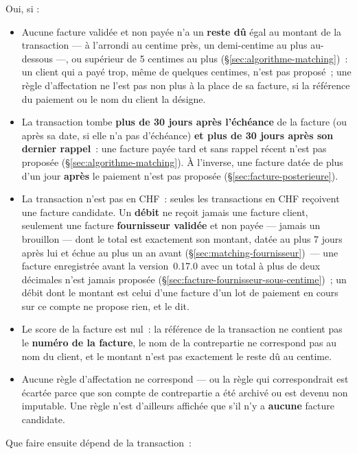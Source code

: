 \documentclass[a4paper,11pt,oneside]{article}
\begin{document}
Oui, si :

\begin{itemize}
    \item Aucune facture validée et non payée n'a un \textbf{reste dû} égal au montant de la transaction --- à l'arrondi au centime près, un demi-centime au plus au-dessous ---, ou supérieur de 5 centimes au plus (\S\ref{sec:algorithme-matching})~: un client qui a payé trop, même de quelques centimes, n'est pas proposé~; une règle d'affectation ne l'est pas non plus à la place de sa facture, si la référence du paiement ou le nom du client la désigne.
    \item La transaction tombe \textbf{plus de 30 jours après l'échéance} de la facture (ou après sa date, si elle n'a pas d'échéance) \textbf{et plus de 30 jours après son dernier rappel}~: une facture payée tard et sans rappel récent n'est pas proposée (\S\ref{sec:algorithme-matching}). À l'inverse, une facture datée de plus d'un jour \textbf{après} le paiement n'est pas proposée (\S\ref{sec:facture-posterieure}).
    \item La transaction n'est pas en CHF~: seules les transactions en CHF reçoivent une facture candidate. Un \textbf{débit} ne reçoit jamais une facture client, seulement une facture \textbf{fournisseur validée} et non payée --- jamais un brouillon --- dont le total est exactement son montant, datée au plus 7 jours après lui et échue au plus un an avant (\S\ref{sec:matching-fournisseur})~--- une facture enregistrée avant la version~0.17.0 avec un total à plus de deux décimales n'est jamais proposée (\S\ref{sec:facture-fournisseur-sous-centime})~; un débit dont le montant est celui d'une facture d'un lot de paiement en cours sur ce compte ne propose rien, et le dit.
    \item Le score de la facture est nul~: la référence de la transaction ne contient pas le \textbf{numéro de la facture}, le nom de la contrepartie ne correspond pas au nom du client, et le montant n'est pas exactement le reste dû au centime.
    \item Aucune règle d'affectation ne correspond --- ou la règle qui correspondrait est écartée parce que son compte de contrepartie a été archivé ou est devenu non imputable. Une règle n'est d'ailleurs affichée que s'il n'y a \textbf{aucune} facture candidate.
\end{itemize}

Que faire ensuite dépend de la transaction~:
\end{document}
